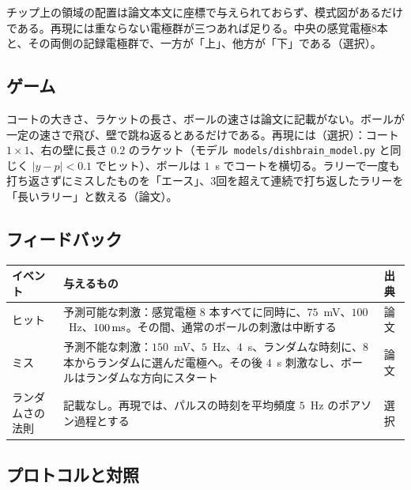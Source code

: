 チップ上の領域の配置は論文本文に座標で与えられておらず、模式図があるだけである。再現には重ならない電極群が三つあれば足りる。中央の感覚電極8本と、その両側の記録電極群で、一方が「上」、他方が「下」である（選択）。

\subsection*{ゲーム}

コートの大きさ、ラケットの長さ、ボールの速さは論文に記載がない。ボールが一定の速さで飛び、壁で跳ね返るとあるだけである。再現には（選択）：コート $1\times1$、右の壁に長さ $0.2$ のラケット（モデル~\texttt{models/dishbrain\_model.py} と同じく $|y-p|<0.1$ でヒット）、ボールは $1$~s でコートを横切る。ラリーで一度も打ち返さずにミスしたものを「エース」、3回を超えて連続で打ち返したラリーを「長いラリー」と数える（論文）。

\subsection*{フィードバック}

\begin{center}
\footnotesize
\setlength{\tabcolsep}{4pt}
\renewcommand{\arraystretch}{1.15}
\begin{tabular}{>{\raggedright}p{2.6cm}>{\raggedright}p{8.3cm}>{\raggedright\arraybackslash}p{1.6cm}}
\toprule
イベント & 与えるもの & 出典 \\
\midrule
ヒット & 予測可能な刺激：感覚電極 $8$ 本すべてに同時に、$75$~mV、$100$~Hz、$100\,\text{ms}$。その間、通常のボールの刺激は中断する & 論文 \\
ミス & 予測不能な刺激：$150$~mV、$5$~Hz、$4$~s、ランダムな時刻に、$8$ 本からランダムに選んだ電極へ。その後 $4$~s 刺激なし、ボールはランダムな方向にスタート & 論文 \\
ランダムさの法則 & 記載なし。再現では、パルスの時刻を平均頻度 $5$~Hz のポアソン過程とする & 選択 \\
\bottomrule
\end{tabular}
\end{center}

\subsection*{プロトコルと対照}

